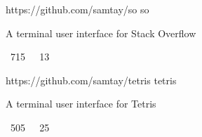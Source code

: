 \vspace{0.25em}
\begin{cvprojects}
  \cvproject
    {https://github.com/samtay/so}
    {so}
    {\begin{cvitems}
        \item A terminal user interface for Stack Overflow
        \item {\color{graytext} \faStarO \, 715 $\;$ \faCodeFork \, 13}
     \end{cvitems}}
  \cvproject
    {https://github.com/samtay/tetris}
    {tetris}
    {\begin{cvitems}
        \item A terminal user interface for Tetris
        \item {\color{graytext} \faStarO \, 505 $\;$ \faCodeFork \, 25}
     \end{cvitems}}
\end{cvprojects}
